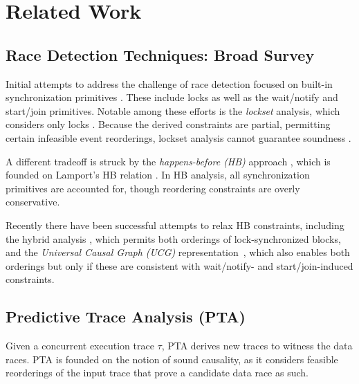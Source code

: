 \section{Related Work}


\subsection{Race Detection Techniques: Broad Survey} 

Initial attempts to address the challenge of race detection focused on 
built-in synchronization primitives \cite{eraser,SasturkarAWS05,vonPraun:2001,
Choi:2002}. These include locks as well as the wait/notify and start/join 
primitives. Notable among these efforts is the \emph{lockset} analysis, 
which considers only locks \cite{eraser}. Because the derived constraints 
are partial, permitting certain infeasible event reorderings, lockset 
analysis cannot guarantee soundness \cite{Naik:2006}. 

A different tradeoff is struck by the \emph{happens-before (HB)} 
approach \cite{Christiaens,Dinning:1990,Mellor-Crummey:1991}, which is 
founded on Lamport's HB relation \cite{Lamport}. In HB analysis, all 
synchronization primitives are accounted for, though reordering constraints 
are overly conservative. 


Recently there have been successful attempts to relax HB constraints, including
the hybrid analysis \cite{hybrid}, which permits both orderings of 
lock-synchronized blocks, and the \emph{Universal Causal Graph (UCG)} 
representation~\cite{ucg}, which also enables both orderings but only 
if these are consistent with wait/notify- and start/join-induced constraints.

\subsection{Predictive Trace Analysis (PTA)}

Given a concurrent execution trace $\tau$, PTA derives new traces to witness 
the data races. PTA is founded on the notion of sound causality, as it 
considers feasible reorderings of the input trace that prove a candidate 
data race as such. 

